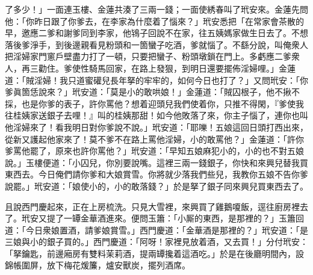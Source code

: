 了多少！」一面連玉樓、金蓮共湊了三兩一錢；一面使綉春叫了玳安來。金蓮先問他：「你昨日跟了你爹去，在李家為什麼着了惱來？」{}玳安悉把「在常家會茶散的早，邀應二爹和謝爹同到李家，他鴇子回說不在家，往五姨媽家做生日去了。不想落後爹淨手，到後邊親看見粉頭和一箇蠻子吃酒，爹就惱了。不繇分說，叫俺衆人把淫婦家門窻戶壁盡力打了一頓，只要把蠻子、粉頭墩鎖在門上。多虧應二爹衆人，再三勸住。爹使性騎馬回家，在路上發狠，到明日還要擺佈淫婦哩。」金蓮道：「賊淫婦！我只道蜜礶兒長年拏的牢牢的，如何今日也打了？」又問玳安：「你爹眞箇恁說來？」{}玳安道：「莫是小的敢哄娘！」金蓮道：「賊囚根子，他不揪不採，也是你爹的表子，許你罵他？{}想着迎頭兒我們使着你，只推不得閑，『爹使我往桂姨家送銀子去哩！』叫的桂姨那甜！如今他敗落了來，你主子惱了，連你也叫他淫婦來了！看我明日對你爹說不說。」玳安道：「耶嚛！五娘這回日頭打西出來，從新又護起他家來了！莫不爹不在路上罵他淫婦，小的敢罵他？」金蓮道：「許你爹罵他罷了，原來也許你罵他？」玳安道：「早知五娘麻犯小的，小的也不對五娘說。」玉樓便道：「小囚兒，你別要說嘴。{}這裡三兩一錢銀子，你快和來興兒替我買東西去。今日俺們請你爹和大娘賞雪。你將就少落我們些兒，我教你五娘不告你爹說罷。」玳安道：「娘使小的，小的敢落錢？」於是拏了銀子同來興兒買東西去了。

且說西門慶起來，正在上房梳洗。只見大雪裡，來興買了雞鵝嗄飯，逕往廚房裡去了。玳安又提了一罈金華酒進來。便問玉簫：「小厮的東西，是那裡的？」玉簫回道：「今日衆娘置酒，請爹娘賞雪。」西門慶道：「金華酒是那裡的？」玳安道：「是三娘與小的銀子買的。」西門慶道：「阿呀！家裡見放着酒，又去買！」分付玳安：「拏鑰匙，前邊廂房有雙料茉莉酒，提兩罈攙着這酒吃。」於是在後廳明間內，設錦帳圍屏，放下梅花煖簾，爐安獸炭，擺列酒席。

